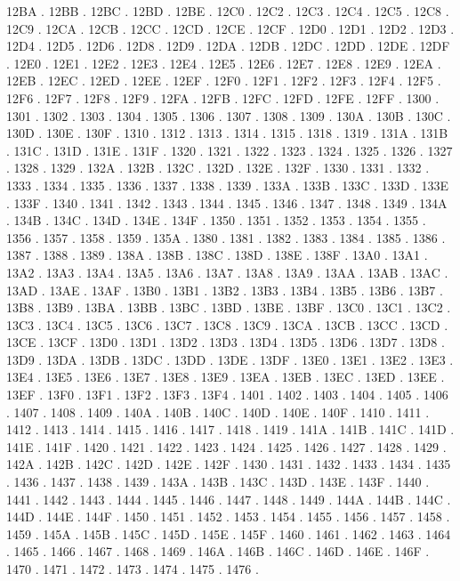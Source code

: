 12BA .
12BB .
12BC .
12BD .
12BE .
12C0 .
12C2 .
12C3 .
12C4 .
12C5 .
12C8 .
12C9 .
12CA .
12CB .
12CC .
12CD .
12CE .
12CF .
12D0 .
12D1 .
12D2 .
12D3 .
12D4 .
12D5 .
12D6 .
12D8 .
12D9 .
12DA .
12DB .
12DC .
12DD .
12DE .
12DF .
12E0 .
12E1 .
12E2 .
12E3 .
12E4 .
12E5 .
12E6 .
12E7 .
12E8 .
12E9 .
12EA .
12EB .
12EC .
12ED .
12EE .
12EF .
12F0 .
12F1 .
12F2 .
12F3 .
12F4 .
12F5 .
12F6 .
12F7 .
12F8 .
12F9 .
12FA .
12FB .
12FC .
12FD .
12FE .
12FF .
1300 .
1301 .
1302 .
1303 .
1304 .
1305 .
1306 .
1307 .
1308 .
1309 .
130A .
130B .
130C .
130D .
130E .
130F .
1310 .
1312 .
1313 .
1314 .
1315 .
1318 .
1319 .
131A .
131B .
131C .
131D .
131E .
131F .
1320 .
1321 .
1322 .
1323 .
1324 .
1325 .
1326 .
1327 .
1328 .
1329 .
132A .
132B .
132C .
132D .
132E .
132F .
1330 .
1331 .
1332 .
1333 .
1334 .
1335 .
1336 .
1337 .
1338 .
1339 .
133A .
133B .
133C .
133D .
133E .
133F .
1340 .
1341 .
1342 .
1343 .
1344 .
1345 .
1346 .
1347 .
1348 .
1349 .
134A .
134B .
134C .
134D .
134E .
134F .
1350 .
1351 .
1352 .
1353 .
1354 .
1355 .
1356 .
1357 .
1358 .
1359 .
135A .
1380 .
1381 .
1382 .
1383 .
1384 .
1385 .
1386 .
1387 .
1388 .
1389 .
138A .
138B .
138C .
138D .
138E .
138F .
13A0 .
13A1 .
13A2 .
13A3 .
13A4 .
13A5 .
13A6 .
13A7 .
13A8 .
13A9 .
13AA .
13AB .
13AC .
13AD .
13AE .
13AF .
13B0 .
13B1 .
13B2 .
13B3 .
13B4 .
13B5 .
13B6 .
13B7 .
13B8 .
13B9 .
13BA .
13BB .
13BC .
13BD .
13BE .
13BF .
13C0 .
13C1 .
13C2 .
13C3 .
13C4 .
13C5 .
13C6 .
13C7 .
13C8 .
13C9 .
13CA .
13CB .
13CC .
13CD .
13CE .
13CF .
13D0 .
13D1 .
13D2 .
13D3 .
13D4 .
13D5 .
13D6 .
13D7 .
13D8 .
13D9 .
13DA .
13DB .
13DC .
13DD .
13DE .
13DF .
13E0 .
13E1 .
13E2 .
13E3 .
13E4 .
13E5 .
13E6 .
13E7 .
13E8 .
13E9 .
13EA .
13EB .
13EC .
13ED .
13EE .
13EF .
13F0 .
13F1 .
13F2 .
13F3 .
13F4 .
1401 .
1402 .
1403 .
1404 .
1405 .
1406 .
1407 .
1408 .
1409 .
140A .
140B .
140C .
140D .
140E .
140F .
1410 .
1411 .
1412 .
1413 .
1414 .
1415 .
1416 .
1417 .
1418 .
1419 .
141A .
141B .
141C .
141D .
141E .
141F .
1420 .
1421 .
1422 .
1423 .
1424 .
1425 .
1426 .
1427 .
1428 .
1429 .
142A .
142B .
142C .
142D .
142E .
142F .
1430 .
1431 .
1432 .
1433 .
1434 .
1435 .
1436 .
1437 .
1438 .
1439 .
143A .
143B .
143C .
143D .
143E .
143F .
1440 .
1441 .
1442 .
1443 .
1444 .
1445 .
1446 .
1447 .
1448 .
1449 .
144A .
144B .
144C .
144D .
144E .
144F .
1450 .
1451 .
1452 .
1453 .
1454 .
1455 .
1456 .
1457 .
1458 .
1459 .
145A .
145B .
145C .
145D .
145E .
145F .
1460 .
1461 .
1462 .
1463 .
1464 .
1465 .
1466 .
1467 .
1468 .
1469 .
146A .
146B .
146C .
146D .
146E .
146F .
1470 .
1471 .
1472 .
1473 .
1474 .
1475 .
1476 .
